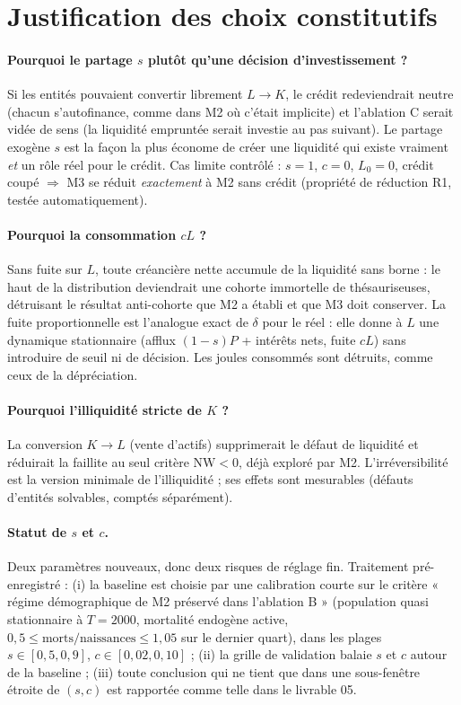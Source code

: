 \documentclass[11pt,a4paper]{article}
\newcommand{\NW}{\mathrm{NW}}
\begin{document}
\section{Justification des choix constitutifs}
\label{sec:justif}

\paragraph{Pourquoi le partage $s$ plutôt qu'une décision d'investissement ?}
Si les entités pouvaient convertir librement $L \to K$, le crédit redeviendrait
neutre (chacun s'autofinance, comme dans M2 où c'était implicite) et l'ablation
C serait vidée de sens (la liquidité empruntée serait investie au pas suivant).
Le partage exogène $s$ est la façon la plus économe de créer une liquidité qui
existe vraiment \emph{et} un rôle réel pour le crédit. Cas limite contrôlé :
$s = 1$, $c = 0$, $L_0 = 0$, crédit coupé $\Rightarrow$ M3 se réduit
\emph{exactement} à M2 sans crédit (propriété de réduction R1, testée
automatiquement).

\paragraph{Pourquoi la consommation $c L$ ?} Sans fuite sur $L$, toute
créancière nette accumule de la liquidité sans borne : le haut de la
distribution deviendrait une cohorte immortelle de thésauriseuses, détruisant
le résultat anti-cohorte que M2 a établi et que M3 doit conserver. La fuite
proportionnelle est l'analogue exact de $\delta$ pour le réel : elle donne à
$L$ une dynamique stationnaire (afflux $(1-s)P$ + intérêts nets, fuite $cL$)
sans introduire de seuil ni de décision. Les joules consommés sont détruits,
comme ceux de la dépréciation.

\paragraph{Pourquoi l'illiquidité stricte de $K$ ?} La conversion $K \to L$
(vente d'actifs) supprimerait le défaut de liquidité et réduirait la faillite
au seul critère $\NW < 0$, déjà exploré par M2. L'irréversibilité est la
version minimale de l'illiquidité ; ses effets sont mesurables (défauts
d'entités solvables, comptés séparément).

\paragraph{Statut de $s$ et $c$.} Deux paramètres nouveaux, donc deux risques
de réglage fin. Traitement pré-enregistré : (i) la baseline est choisie par une
calibration courte sur le critère « régime démographique de M2 préservé dans
l'ablation B » (population quasi stationnaire à $T = 2000$, mortalité endogène
active, $0{,}5 \le \text{morts/naissances} \le 1{,}05$ sur le dernier quart),
dans les plages $s \in [0{,}5, 0{,}9]$, $c \in [0{,}02, 0{,}10]$ ; (ii) la
grille de validation balaie $s$ et $c$ autour de la baseline ; (iii) toute
conclusion qui ne tient que dans une sous-fenêtre étroite de $(s, c)$ est
rapportée comme telle dans le livrable 05.
\end{document}
